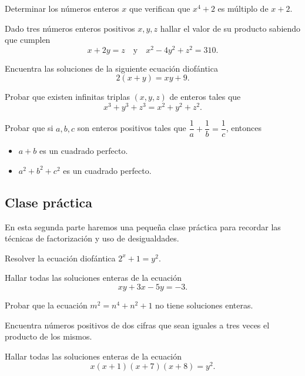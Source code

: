 \begin{exercise}
    Determinar los números enteros $x$ que verifican que $x^4 + 2$ es múltiplo de $x + 2$.
\end{exercise}

\begin{exercise}
    Dado tres números enteros positivos $x,y,z$ hallar el valor de su producto sabiendo que cumplen
    \[
        x + 2y = z \quad \text{y} \quad x^2 - 4y^2 + z^2 = 310.
    \]
\end{exercise}

\begin{exercise}
    Encuentra las soluciones de la siguiente ecuación diofántica
    \[
        2(x + y) = xy + 9.
    \]
\end{exercise}

\begin{exercise}
    Probar que existen infinitas triplas $(x,y,z)$ de enteros tales que
    \[
        x^3 + y^3 + z^3 = x^2 + y^2 + z^2.
    \]
\end{exercise}

\begin{problem}
    Probar que si $a,b,c$ son enteros positivos tales que $\dfrac{1}{a} + \dfrac{1}{b} = \dfrac{1}{c}$, entonces
    \begin{itemize}
        \item $a + b$ es un cuadrado perfecto.
        \item $a^2 + b^2 + c^2$ es un cuadrado perfecto.
    \end{itemize}
\end{problem}



\subsection{Clase práctica}

En esta segunda parte haremos una pequeña clase práctica para recordar las técnicas de factorización y uso de desigualdades.

\begin{exercise}
    Resolver la ecuación diofántica $2^x + 1 = y^2$.
\end{exercise}

\begin{exercise}
    Hallar todas las soluciones enteras de la ecuación
    \[
        xy + 3x - 5y = -3.
    \]
\end{exercise}

\begin{exercise}
    Probar que la ecuación $m^2 = n^4 + n^2 + 1$ no tiene soluciones enteras.
\end{exercise}

\begin{exercise}
    Encuentra números positivos de dos cifras que sean iguales a tres veces el producto de los mismos.
\end{exercise}

\begin{exercise}
    Hallar todas las soluciones enteras de la ecuación
    \[
        x(x + 1)(x + 7)(x + 8) = y^2.
    \]
\end{exercise}